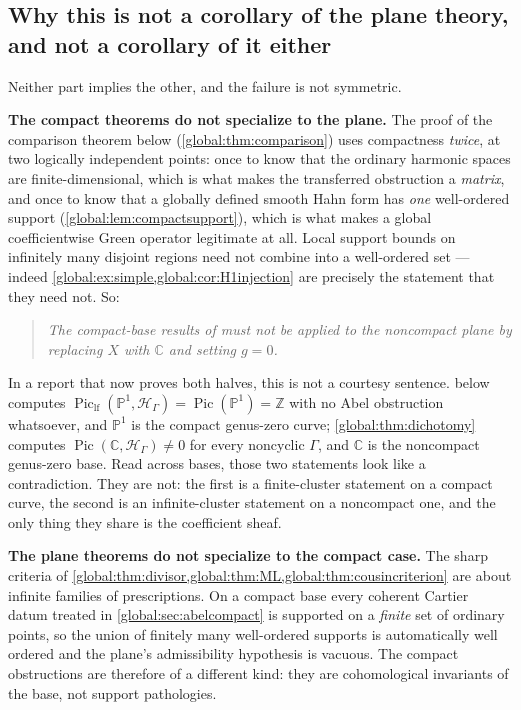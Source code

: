 \documentclass[11pt,letterpaper]{article}
\theoremstyle{definition}
\theoremstyle{remark}
\newcommand{\C}{\mathbb C}
\newcommand{\Z}{\mathbb Z}
\newcommand{\HH}{\mathscr H_\Gamma}
\newcommand{\Pic}{\operatorname{Pic}}
\newcommand{\Piclf}{\operatorname{Pic}_{\mathrm{lf}}}
\numberwithin{equation}{section}
\begin{document}
\subsection{Why this is not a corollary of the plane theory, and not a corollary of it either}\label{global:sub:twobasewarning}

Neither part implies the other, and the failure is not symmetric.

\smallskip
\noindent\textbf{The compact theorems do not specialize to the plane.} The proof of the comparison theorem below (\cref{global:thm:comparison}) uses compactness \emph{twice}, at two logically independent points: once to know that the ordinary harmonic spaces are finite-dimensional, which is what makes the transferred obstruction a \emph{matrix}, and once to know that a globally defined smooth Hahn form has \emph{one} well-ordered support (\cref{global:lem:compactsupport}), which is what makes a global coefficientwise Green operator legitimate at all. Local support bounds on infinitely many disjoint regions need not combine into a well-ordered set --- indeed \cref{global:ex:simple,global:cor:H1injection} are precisely the statement that they need not. So:

\begin{quote}\itshape
The compact-base results of  must not be applied to the noncompact plane by replacing $X$ with $\C$ and setting $g=0$.
\end{quote}

In a report that now proves both halves, this is not a courtesy sentence.  below computes $\Piclf(\mathbb P^1,\HH)=\Pic(\mathbb P^1)=\Z$ with no Abel obstruction whatsoever, and $\mathbb P^1$ is the compact genus-zero curve; \cref{global:thm:dichotomy} computes $\Pic(\C,\HH)\ne0$ for every noncyclic $\Gamma$, and $\C$ is the noncompact genus-zero base. Read across bases, those two statements look like a contradiction. They are not: the first is a finite-cluster statement on a compact curve, the second is an infinite-cluster statement on a noncompact one, and the only thing they share is the coefficient sheaf.

\smallskip
\noindent\textbf{The plane theorems do not specialize to the compact case.} The sharp criteria of \cref{global:thm:divisor,global:thm:ML,global:thm:cousincriterion} are about infinite families of prescriptions. On a compact base every coherent Cartier datum treated in \cref{global:sec:abelcompact} is supported on a \emph{finite} set of ordinary points, so the union of finitely many well-ordered supports is automatically well ordered and the plane's admissibility hypothesis is vacuous. The compact obstructions are therefore of a different kind: they are cohomological invariants of the base, not support pathologies.
\end{document}
